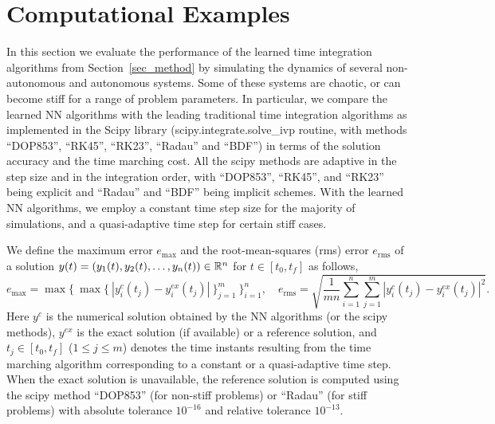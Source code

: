 \section{Computational Examples}
\label{sec_tests}


In this section we evaluate the performance of the learned time integration algorithms 
from Section~\ref{sec_method} by simulating the dynamics of
several non-autonomous and autonomous systems.
Some of these systems are chaotic, or can become
stiff for a range of problem parameters.
In particular, we compare the learned NN algorithms with
the leading traditional time integration algorithms
as implemented in the Scipy library (scipy.integrate.solve\_ivp routine,
with methods ``DOP853'', ``RK45'', ``RK23'', ``Radau'' and ``BDF'')
in terms of the solution accuracy and the time marching cost.
All the scipy methods are adaptive in the step size and in the integration order,
with ``DOP853'', ``RK45'', and ``RK23'' being explicit and
``Radau'' and ``BDF'' being implicit schemes.
With the learned NN algorithms, we employ a constant time step size
for the majority of
simulations, and a quasi-adaptive time step for
certain stiff cases.


We define the maximum error $e_{\max}$ and the root-mean-squares (rms)
error $e_{\text{rms}}$ of a solution
$y(t)=(y_1(t),y_2(t),\dots,y_n(t))\in\mathbb{R}^n$ for $t\in[t_0,t_f]$ as follows,
  \begin{equation}
    e_{\max} = \max\{\ \max\{\ |y_i^c(t_j) - y_i^{ex}(t_j)|\  \}_{j=1}^m  \ \}_{i=1}^n, \quad
    e_{\text{rms}} = \sqrt{\frac{1}{mn}\sum_{i=1}^n\sum_{j=1}^m|y_i^c(t_j) - y_i^{ex}(t_j)|^2 }.
  \end{equation}
Here $y^c$ is the numerical solution obtained by the NN algorithms (or
the scipy methods), $y^{ex}$ is the exact solution (if available)
or a reference solution, and $t_j\in[t_0,t_f]$ ($1\leqslant j\leqslant m$)
denotes the time instants resulting from the
time marching algorithm corresponding to a constant or a quasi-adaptive
time step. When the exact solution is unavailable, the reference solution
is computed using the scipy method ``DOP853'' (for non-stiff problems)
or ``Radau'' (for stiff problems) with absolute tolerance $10^{-16}$
and relative tolerance $10^{-13}$.  



